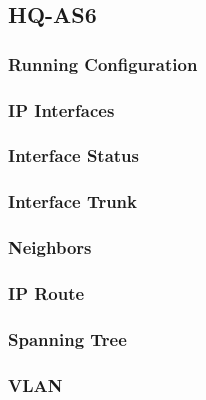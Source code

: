 \subsection{HQ-AS6}
\subsubsection{Running Configuration}


\subsubsection{IP Interfaces}


\subsubsection{Interface Status}


\subsubsection{Interface Trunk}


\subsubsection{Neighbors}


\subsubsection{IP Route}


\subsubsection{Spanning Tree}


\subsubsection{VLAN}




